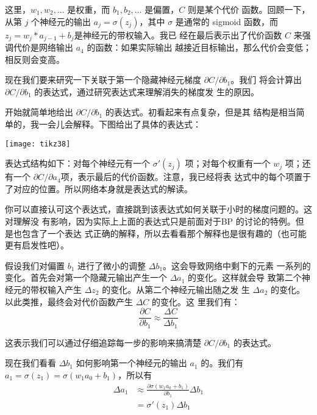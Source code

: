 这里，$w_1, w_2, ...$ 是权重，而 $b_1, b_2, ...$ 是偏置，$C$ 则是某个代价
函数。回顾一下，从第 $j$ 个神经元的输出 $a_j = \sigma(z_j)$，其中 $\sigma$
是通常的 sigmoid 函数，而 $z_j = w_j * a_{j-1} + b_j$是神经元的带权输入。我已
经在最后表示出了代价函数 $C$ 来强调代价是网络输出 $a_4$ 的函数：如果实际输出
越接近目标输出，那么代价会变低；相反则会变高。
 
现在我们要来研究一下关联于第一个隐藏神经元梯度 $\partial C/\partial b_1$。我们
将会计算出$\partial C/\partial b_1$ 的表达式，通过研究表达式来理解消失的梯度发
生的原因。
 
开始就简单地给出 $\partial C/\partial b_1$ 的表达式。初看起来有点复杂，但是其
结构是相当简单的，我一会儿会解释。下图给出了具体的表达式：
\begin{center}
  \texttt{[image: tikz38]}
\end{center}

表达式结构如下：对每个神经元有一个 $\sigma'(z_j)$ 项；对每个权重有一个 $w_j$
项；还有一个 $\partial C/\partial a_4$项，表示最后的代价函数。注意，我已经将表
达式中的每个项置于了对应的位置。所以网络本身就是表达式的解读。
 
你可以直接认可这个表达式，直接跳到该表达式如何关联于小时的梯度问题的。这对理解没
有影响，因为实际上上面的表达式只是前面对于BP 的讨论的特例。但是也包含了一个表达
式正确的解释，所以去看看那个解释也是很有趣的（也可能更有启发性吧）。
 
假设我们对偏置 $b_1$ 进行了微小的调整 $\Delta b_1$。这会导致网络中剩下的元素
一系列的变化。首先会对第一个隐藏元输出产生一个 $\Delta a_1$ 的变化。这样就会导
致第二个神经元的带权输入产生 $\Delta z_2$ 的变化。从第二个神经元输出随之发
生 $\Delta a_2$ 的变化。以此类推，最终会对代价函数产生 $\Delta C$ 的变化。这
里我们有：
\begin{equation}
  \frac{\partial C}{\partial b_1} \approx \frac{\Delta C}{\Delta b_1}
  \label{eq:114}\tag{114}
\end{equation}

这表示我们可以通过仔细追踪每一步的影响来搞清楚 $\partial C/\partial b_1$ 的表达式。 

现在我们看看 $\Delta b_1$ 如何影响第一个神经元的输出 $a_1$ 的。我们有 $a_1 =
\sigma(z_1) = \sigma(w_1 a_0 + b_1)$，所以有
\begin{align}
  \Delta a_1 & \approx 
  \frac{\partial \sigma(w_1 a_0+b_1)}{\partial b_1} \Delta b_1 \label{eq:115}\tag{115}\\
  & = \sigma'(z_1) \Delta b_1 \label{eq:116}\tag{116}
\end{align}
 
